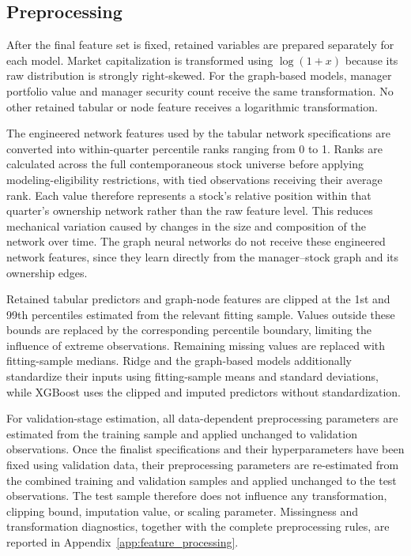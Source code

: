 \subsection{Preprocessing}

After the final feature set is fixed, retained variables are prepared separately for each model. Market capitalization is transformed using \(\log(1+x)\) because its raw distribution is strongly right-skewed. For the graph-based models, manager portfolio value and manager security count receive the same transformation. No other retained tabular or node feature receives a logarithmic transformation.

The engineered network features used by the tabular network specifications are converted into within-quarter percentile ranks ranging from 0 to 1. Ranks are calculated across the full contemporaneous stock universe before applying modeling-eligibility restrictions, with tied observations receiving their average rank. Each value therefore represents a stock's relative position within that quarter's ownership network rather than the raw feature level. This reduces mechanical variation caused by changes in the size and composition of the network over time. The graph neural networks do not receive these engineered network features, since they learn directly from the manager--stock graph and its ownership edges.

Retained tabular predictors and graph-node features are clipped at the 1st and 99th percentiles estimated from the relevant fitting sample. Values outside these bounds are replaced by the corresponding percentile boundary, limiting the influence of extreme observations. Remaining missing values are replaced with fitting-sample medians. Ridge and the graph-based models additionally standardize their inputs using fitting-sample means and standard deviations, while XGBoost uses the clipped and imputed predictors without standardization.

For validation-stage estimation, all data-dependent preprocessing parameters are estimated from the training sample and applied unchanged to validation observations. Once the finalist specifications and their hyperparameters have been fixed using validation data, their preprocessing parameters are re-estimated from the combined training and validation samples and applied unchanged to the test observations. The test sample therefore does not influence any transformation, clipping bound, imputation value, or scaling parameter. Missingness and transformation diagnostics, together with the complete preprocessing rules, are reported in Appendix~\ref{app:feature_processing}.

